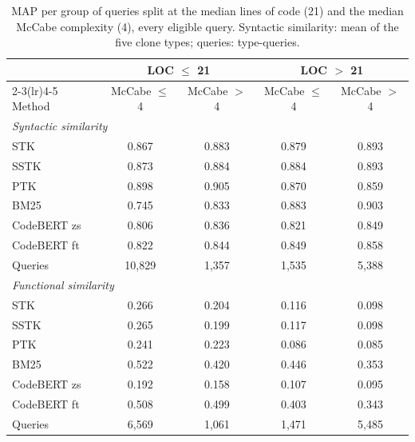 \begin{table}[!htbp]
\centering
\caption{MAP per group of queries split at the median lines of code (21) and the median McCabe complexity (4), every eligible query. Syntactic similarity: mean of the five clone types; queries: type-queries.}
\label{tab:quadrants}
\footnotesize
\setlength{\tabcolsep}{4pt}
\begin{tabular}{lcccc}
\toprule
 & \multicolumn{2}{c}{LOC $\le$ 21} & \multicolumn{2}{c}{LOC $>$ 21} \\
\cmidrule(lr){2-3}\cmidrule(lr){4-5}
Method & McCabe $\le$ 4 & McCabe $>$ 4 & McCabe $\le$ 4 & McCabe $>$ 4 \\
\midrule
\multicolumn{5}{l}{\emph{Syntactic similarity}} \\
\quad STK & 0.867 & 0.883 & 0.879 & 0.893 \\
\quad SSTK & 0.873 & 0.884 & 0.884 & 0.893 \\
\quad PTK & 0.898 & 0.905 & 0.870 & 0.859 \\
\quad BM25 & 0.745 & 0.833 & 0.883 & 0.903 \\
\quad CodeBERT zs & 0.806 & 0.836 & 0.821 & 0.849 \\
\quad CodeBERT ft & 0.822 & 0.844 & 0.849 & 0.858 \\
\quad Queries & 10,829 & 1,357 & 1,535 & 5,388 \\
\midrule
\multicolumn{5}{l}{\emph{Functional similarity}} \\
\quad STK & 0.266 & 0.204 & 0.116 & 0.098 \\
\quad SSTK & 0.265 & 0.199 & 0.117 & 0.098 \\
\quad PTK & 0.241 & 0.223 & 0.086 & 0.085 \\
\quad BM25 & 0.522 & 0.420 & 0.446 & 0.353 \\
\quad CodeBERT zs & 0.192 & 0.158 & 0.107 & 0.095 \\
\quad CodeBERT ft & 0.508 & 0.499 & 0.403 & 0.343 \\
\quad Queries & 6,569 & 1,061 & 1,471 & 5,485 \\
\bottomrule
\end{tabular}
\end{table}
